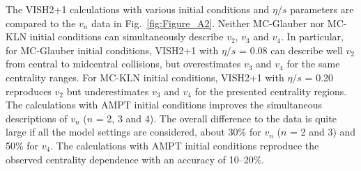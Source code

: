 The VISH2+1 calculations with various initial conditions and $\eta/s$ parameters are compared to the $v_n$ data in Fig.~\ref{fig:Figure_A2}.
Neither MC-Glauber nor MC-KLN initial conditions can simultaneously describe $v_2$, $v_3$ and $v_4$. In particular, for MC-Glauber initial conditions, VISH2+1 with $\eta/s$ = 0.08 can describe well $v_2$ from central to midcentral collisions, but overestimates $v_3$ and $v_4$ for the same centrality ranges. For MC-KLN initial conditions, VISH2+1 with $\eta/s$ = 0.20 reproduces $v_2$ but underestimates $v_3$ and $v_4$ for the presented centrality regions. The calculations with AMPT initial conditions improves the simultaneous descriptions of $v_n$ ($n$ = 2, 3 and 4). The overall difference to the data is quite large if all the model settings are considered, about 30\% for $v_n$ ($n$ = 2 and 3) and 50\% for $v_4$. The calculations with AMPT initial conditions reproduce the observed centrality dependence with an accuracy of 10--20\%.

